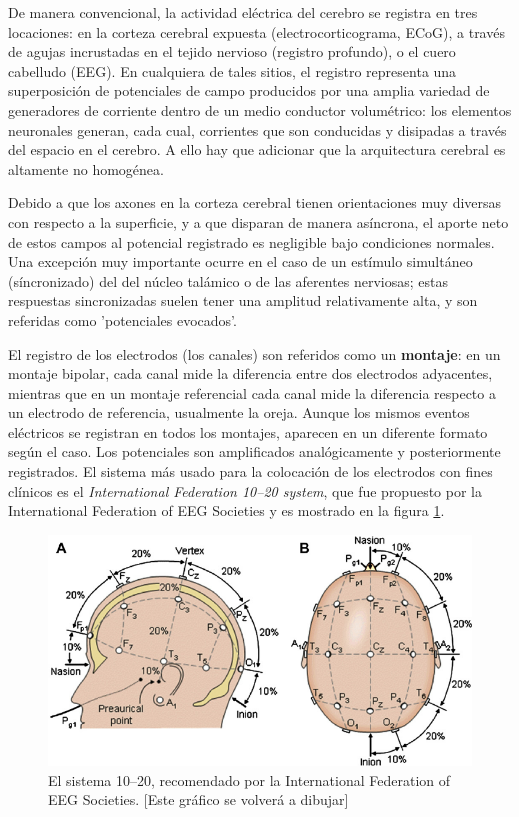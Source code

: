 \documentclass[12pt,a4paper]{mitthesis}
\begin{document}
De manera convencional, la actividad el\'ectrica del cerebro se registra en tres locaciones: en la 
corteza cerebral expuesta (electrocorticograma, ECoG), a trav\'es de agujas incrustadas en el 
tejido nervioso (registro profundo), o el cuero cabelludo (EEG).
En cualquiera de tales sitios, el registro representa una superposici\'on de potenciales de campo 
producidos por una amplia variedad de generadores de corriente dentro de un medio conductor 
volum\'etrico: los elementos neuronales generan, cada cual, corrientes que son conducidas y 
disipadas a trav\'es del espacio en el cerebro.
A ello hay que adicionar que la arquitectura cerebral es altamente no homog\'enea.

Debido a que los axones en la corteza cerebral tienen orientaciones muy diversas con respecto a la 
superficie, y a que disparan de manera as\'incrona, el aporte neto de estos campos al potencial 
registrado es negligible bajo condiciones normales.
Una excepci\'on muy importante ocurre en el caso de un est\'imulo simult\'aneo (s\'incronizado) del 
del n\'ucleo tal\'amico o de las aferentes nerviosas; estas respuestas sincronizadas suelen tener 
una amplitud relativamente alta, y son referidas como 'potenciales evocados'.

El registro de los electrodos (los canales) son referidos como un \textbf{montaje}: en un montaje 
bipolar, cada canal mide la diferencia entre dos electrodos adyacentes, mientras que en un montaje 
referencial cada canal mide la diferencia respecto a un electrodo de referencia, usualmente la 
oreja.
Aunque los mismos eventos el\'ectricos se registran en todos los montajes, aparecen en un diferente 
formato seg\'un el caso. 
Los potenciales son amplificados anal\'ogicamente y posteriormente registrados.
El sistema m\'as usado para la colocaci\'on de los electrodos con fines cl\'inicos es el 
\textit{International Federation 10--20 system}, que fue propuesto por la International Federation 
of EEG Societies \cite{Jasper58,AASM07} y es mostrado en la figura \ref{img1020}. 

\begin{figure}
\centering
\includegraphics[width=0.9\linewidth]{Fig.png} 
\caption{El sistema 10--20, recomendado por la
International Federation of EEG Societies. [Este gr\'afico se volver\'a a dibujar]
}
\label{img1020}
\end{figure}
\end{document}
